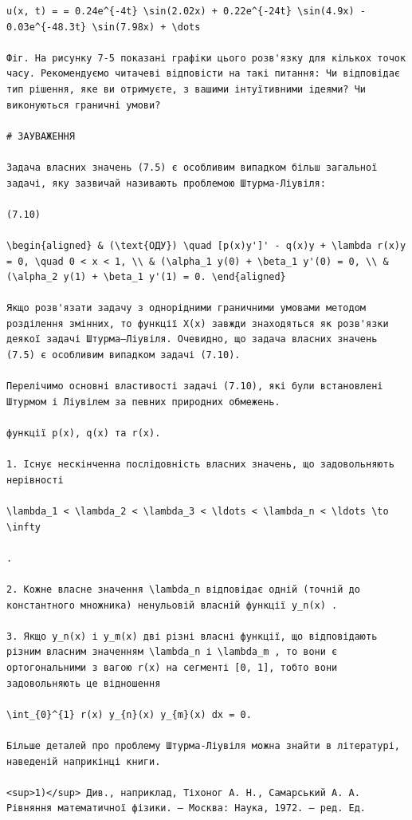 \documentclass[
  ukrainian,
]{article}
\begin{document}
\begin{verbatim}
u(x, t) = = 0.24e^{-4t} \sin(2.02x) + 0.22e^{-24t} \sin(4.9x) - 0.03e^{-48.3t} \sin(7.98x) + \dots

Фіг. На рисунку 7-5 показані графіки цього розв'язку для кількох точок часу. Рекомендуємо читачеві відповісти на такі питання: Чи відповідає тип рішення, яке ви отримуєте, з вашими інтуїтивними ідеями? Чи виконуються граничні умови?

# ЗАУВАЖЕННЯ

Задача власних значень (7.5) є особливим випадком більш загальної задачі, яку зазвичай називають проблемою Штурма-Ліувіля:

(7.10)

\begin{aligned} & (\text{ОДУ}) \quad [p(x)y']' - q(x)y + \lambda r(x)y = 0, \quad 0 < x < 1, \\ & (\alpha_1 y(0) + \beta_1 y'(0) = 0, \\ & (\alpha_2 y(1) + \beta_1 y'(1) = 0. \end{aligned}

Якщо розв'язати задачу з однорідними граничними умовами методом розділення змінних, то функції X(x) завжди знаходяться як розв'язки деякої задачі Штурма–Ліувіля. Очевидно, що задача власних значень (7.5) є особливим випадком задачі (7.10).

Перелічимо основні властивості задачі (7.10), які були встановлені Штурмом і Ліувілем за певних природних обмежень.

функції p(x), q(x) та r(x).

1. Існує нескінченна послідовність власних значень, що задовольняють нерівності

\lambda_1 < \lambda_2 < \lambda_3 < \ldots < \lambda_n < \ldots \to \infty

.

2. Кожне власне значення \lambda_n відповідає одній (точній до константного множника) ненульовій власній функції y_n(x) .

3. Якщо y_n(x) і y_m(x) дві різні власні функції, що відповідають різним власним значенням \lambda_n і \lambda_m , то вони є ортогональними з вагою r(x) на сегменті [0, 1], тобто вони задовольняють це відношення

\int_{0}^{1} r(x) y_{n}(x) y_{m}(x) dx = 0.

Більше деталей про проблему Штурма-Ліувіля можна знайти в літературі, наведеній наприкінці книги.

<sup>1)</sup> Див., наприклад, Тіхоног А. Н., Самарський А. А. Рівняння математичної фізики. — Москва: Наука, 1972. — ред. Ед.


\end{verbatim}
\end{document}
